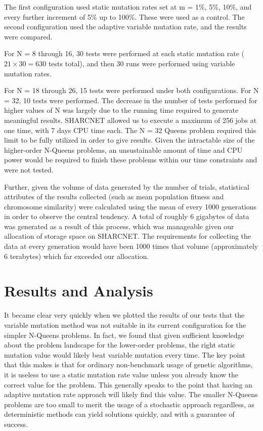 \documentclass{sig-alternate}
\begin{document}
The first configuration used static mutation rates set at m = 1\%, 5\%, 10\%, and every further increment of 5\% up to 100\%. These were used as a control. The second configuration used the adaptive variable mutation rate, and the results were compared. 

For N = 8 through 16, 30 tests were performed at each static mutation rate ($21 \times 30 = 630$ tests total), and then 30 runs were performed using variable mutation rates. 

For N = 18 through 26, 15 tests were performed under both configurations. For N = 32, 10 tests were performed. The decrease in the number of tests performed for higher values of N was largely due to the running time required to generate meaningful results. SHARCNET allowed us to execute a maximum of 256 jobs at one time, with 7 days CPU time each. The N = 32 Queens problem required this limit to be fully utilized in order to give results. Given the intractable size of the higher-order N-Queens problems, an unsustainable amount of time and CPU power would be required to finish these problems within our time constraints and were not tested.

Further, given the volume of data generated by the number of trials, statistical attributes of the results collected (such as mean population fitness and chromosome similarity) were calculated using the mean of every 1000 generations in order to observe the central tendency. A total of roughly 6 gigabytes of data was generated as a result of this process, which was manageable given our allocation of storage space on SHARCNET. The requirements for collecting the data at every generation would have been 1000 times that volume (approximately 6 terabytes) which far exceeded our allocation.

% 
%
\newpage
\section{Results and Analysis}
It became clear very quickly when we plotted the results of our tests that the variable mutation method was not suitable in its current configuration for the simpler N-Queens problems. In fact, we found that given sufficient knowledge about the problem landscape for the lower-order problems, the right static mutation value would likely beat variable mutation every time. The key point that this makes is that for ordinary non-benchmark usage of genetic algorithms, it is useless to use a static mutation rate value unless you already know the correct value for the problem. This generally speaks to the point that having an adaptive mutation rate approach will likely find this value. The smaller N-Queens problems are too small to merit the usage of a stochastic approach regardless, as deterministic methods can yield solutions quickly, and with a guarantee of success.
\end{document}
